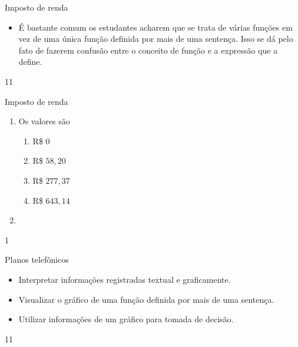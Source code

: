 \begin{sugestions}{Imposto de renda}
{
\begin{itemize}
\item É bastante comum os estudantes acharem que se trata de várias funções em vez de uma única função definida por mais de uma sentença. Isso se dá pelo fato de fazerem confusão entre o conceito de função e a expressão que a define.
\end{itemize}
}{1}{1}
\end{sugestions}
\clearmargin
\begin{answer}{Imposto de renda}
{
\begin{enumerate}
\item Os valores são

\begin{enumerate}
\item R\$ $0$ 
\item R\$ $58{,}20$
\item R\$ $277{,}37$
\item R\$ $643{,}14$
\end{enumerate}

\item
{}

\end{enumerate}
}{1}
\end{answer}
\clearmargin
\begin{objectives}{Planos telefônicos}
{
\begin{itemize}

\item Interpretar informações registradas textual e graficamente.

\item Visualizar o gráfico de uma função definida por mais de uma sentença.

\item  Utilizar informações de um gráfico para tomada de decisão.

\end{itemize}
}{1}{1}
\end{objectives}
